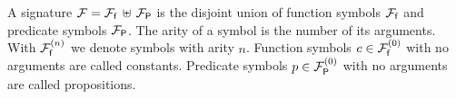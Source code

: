 
\begin{definition}\label{def:signature}
A {\myem signature} ${\mathcal F}={{\mathcal F}_{\mathsf f}}\,\uplus\,{{\mathcal F}_{\mathsf P}}$ is the disjoint union 
of {\myem function symbols} ${{\mathcal F}_{\mathsf f}}$ 
and {\myem predicate symbols} ${{\mathcal F}_{\mathsf P}}$.
The {\myem arity} of a symbol is the number of its arguments.
With ${{\mathcal F}_{\mathsf f}^{(n)}}$ we denote symbols with arity $n$.
Function symbols $c\in{{\mathcal F}_{\mathsf f}^{(0)}}$ with no arguments are called {\myem constants}.
Predicate symbols $p\in{{\mathcal F}_{\mathsf P}^{(0)}}$ with no arguments are called propositions. 
\end{definition}

